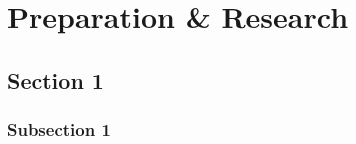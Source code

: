 
\chapter{Preparation \& Research}


\section[Section 1]{Section 1}
\subsection[Subsection 1]{Subsection 1}